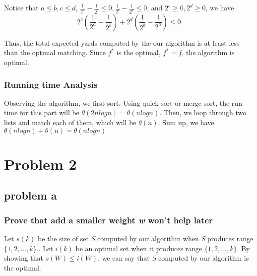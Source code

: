 \documentclass{article}
\begin{document}
        Notice that $a\leq b, c\leq d$, $\frac{1}{2^a}-\frac{1}{2^b} \leq 0, \frac{1}{2^c}-\frac{1}{2^d} \leq 0$, and $2^c \geq 0, 2^d\geq 0$, we have
        \[2^c(\frac{1}{2^a}-\frac{1}{2^b})+2^d(\frac{1}{2^b}-\frac{1}{2^a}) \leq 0\]

        Thus, the total expected yards computed by the our algorithm is at least less than the optimal matching. Since $f^*$ is the optimal, $f^* = f$, the algorithm is optimal.
        \\
        \subsubsection{Running time Analysis} 
        Observing the algorithm, we first sort. Using quick sort or merge sort, the run time for this part will be $\theta(2nlogn) = \theta(nlogn)$. Then, we loop through two lists and match each of them, which will be $\theta(n)$. Sum up, we have $\theta(nlogn)+\theta(n) = \theta(nlogn)$

\section{Problem 2}
    \subsection{problem a}
        \subsubsection{Prove that add a smaller weight \textit{w} won't help later}

        Let $s(k)$ be the size of set \textit{S} computed by our algorithm when \textit{S} produces range $\{1,2,...,k\}$.. Let $i(k)$ be an optimal set when it produces range $\{1,2,...,k\}$. By showing that $s(W) \leq i(W)$, we can say that \textit{S} computed by our algorithm is the optimal.
        
\end{document}
